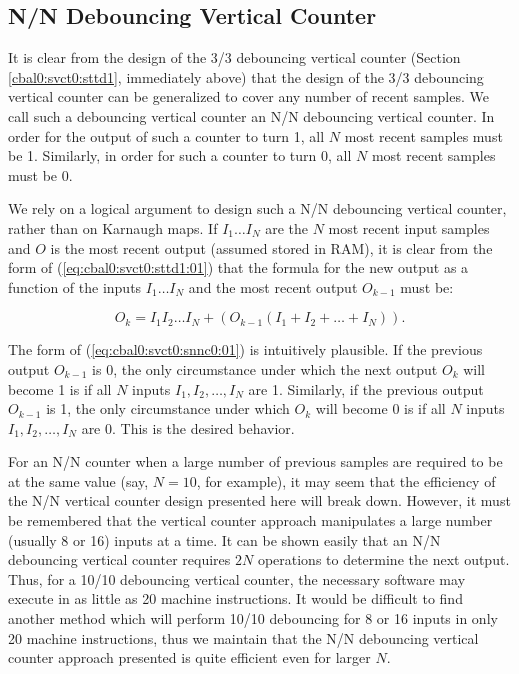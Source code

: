 \subsection{N/N Debouncing Vertical Counter}
\label{cbal0:svct0:snnc0}

It is clear from 
the design of the 3/3 debouncing
vertical counter (Section \ref{cbal0:svct0:sttd1}, immediately
above) that the design of the 3/3 debouncing vertical counter
can be generalized to cover any number of recent samples.
We call such a debouncing vertical counter an N/N debouncing
vertical counter.  In order for the output of such a counter to
turn 1, all $N$ most recent samples must be 1.  Similarly, in order
for such a counter to turn 0, all $N$ most recent samples must be 0.

We rely on a logical argument to design such a N/N debouncing
vertical counter, rather than on Karnaugh maps.  If $I_1 \ldots I_N$
are the $N$ most recent input samples and $O$ is the most recent
output (assumed stored in RAM), it is clear from the form of
(\ref{eq:cbal0:svct0:sttd1:01}) that the formula for the new output
as a function of the inputs $I_1 \ldots I_N$ and the 
most recent output $O_{k-1}$ must be:

\begin{equation}
\label{eq:cbal0:svct0:snnc0:01}
O_k = I_1 I_2 \ldots I_N + (O_{k-1} (I_1 + I_2 + \ldots + I_N)) .
\end{equation}

The form of (\ref{eq:cbal0:svct0:snnc0:01}) is intuitively 
plausible.  If the previous output $O_{k-1}$ is 0, the only
circumstance under which the next output $O_k$ will become 1
is if all $N$ inputs $I_1, I_2, \ldots , I_N$ are 1.
Similarly, if the previous output $O_{k-1}$ is 1, the only
circumstance under which $O_k$ will become 0
is if all $N$ inputs $I_1, I_2, \ldots , I_N$ are 0.  This
is the desired behavior.

For an N/N counter when a large number of previous samples
are required to be at the same value (say, $N=10$, for example),
it may seem that the efficiency of the N/N vertical counter
design presented here will break down.  However, it must be
remembered that the vertical counter approach manipulates
a large number (usually 8 or 16) inputs at a time.  It can be
shown easily that an N/N debouncing vertical counter requires
$2N$ operations to determine the next output.  Thus, for a
10/10 debouncing vertical counter, the necessary software 
may execute in as little as 20 machine instructions.  It would
be difficult to find another method which will perform 10/10
debouncing for 8 or 16 inputs in only 20 machine instructions, thus
we maintain that the N/N debouncing vertical counter
approach presented is quite efficient even for larger
$N$.


